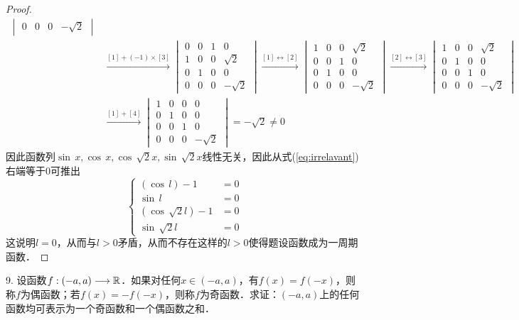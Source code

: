 \begin{proof}
\begin{align}
\begin{vmatrix}
            0 & 0 & 0 & -\sqrt{2}
    \end{vmatrix} \\
    &\xrightarrow{[1] + (-1) \times [3]} \begin{vmatrix}
        0 & 0 & 1 & 0 \\
        1 & 0 & 0 & \sqrt{2} \\
        0 & 1 & 0 & 0 \\
        0 & 0 & 0 & -\sqrt{2}
    \end{vmatrix} \xrightarrow{[1] \longleftrightarrow [2]} \begin{vmatrix}
        1 & 0 & 0 & \sqrt{2} \\
        0 & 0 & 1 & 0 \\
        0 & 1 & 0 & 0 \\
        0 & 0 & 0 & -\sqrt{2}
    \end{vmatrix} \xrightarrow{[2] \longleftrightarrow [3]} \begin{vmatrix}
            1 & 0 & 0 & \sqrt{2} \\
            0 & 1 & 0 & 0 \\
            0 & 0 & 1 & 0 \\
            0 & 0 & 0 & -\sqrt{2}
    \end{vmatrix} \\
    &\xrightarrow{[1] + [4]} \begin{vmatrix}
        1 & 0 & 0 & 0 \\
            0 & 1 & 0 & 0 \\
            0 & 0 & 1 & 0 \\
            0 & 0 & 0 & -\sqrt{2}
    \end{vmatrix} = -\sqrt{2} \neq 0
\end{align}
因此函数列$\sin \, x, \cos \, x, \cos \, \sqrt{2}x , \sin \, \sqrt{2} x$线性无关，因此从式(\ref{eq:irrelavant})右端等于$0$可推出
\begin{equation}
    \begin{cases}
        (\cos \, l) - 1 &= 0 \\
        \sin \, l &= 0 \\
        (\cos \, \sqrt{2} l) - 1 &= 0 \\
        \sin \, \sqrt{2} l &= 0
    \end{cases}
\end{equation}
这说明$l = 0$，从而与$l > 0$矛盾，从而不存在这样的$l > 0$使得题设函数成为一周期函数．
\end{proof}

9. 设函数$f: (-a, a) \longrightarrow \mathbb{R}$．如果对任何$x \in (-a, a)$，有$f(x) = f(-x)$，则称$f$为偶函数；若$f(x) = -f(-x)$，则称$f$为奇函数．求证：$(-a, a)$上的任何函数均可表示为一个奇函数和一个偶函数之和．

